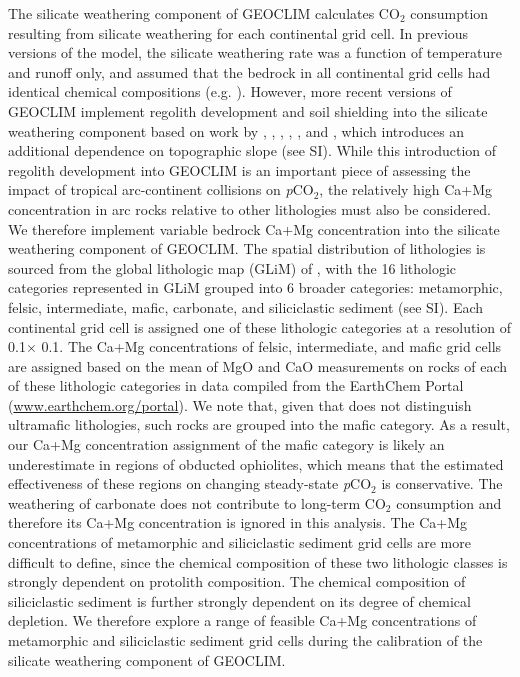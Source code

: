 \documentclass[11pt,letterpaper]{article}
\newcommand{\degrees}{\textdegree\xspace}
\newcommand{\pCOtwo}{\textit{p}CO$_{2}$\xspace}
\newcommand{\COtwo}{CO$_{2}$\xspace}
\begin{document}
The silicate weathering component of GEOCLIM calculates \COtwo consumption resulting from silicate weathering for each continental grid cell. In previous versions of the model, the silicate weathering rate was a function of temperature and runoff only, and assumed that the bedrock in all continental grid cells had identical chemical compositions (e.g. \citealp{Godderis2014a}). However, more recent versions of GEOCLIM implement regolith development and soil shielding into the silicate weathering component based on work by \citet{Heimsath1997a}, \citet{Gabet2009a}, \citet{West2012a}, \citet{Carretier2014a}, \citet{Godderis2017b}, and \citet{Maffre2018a}, which introduces an additional dependence on topographic slope (see SI). While this introduction of regolith development into GEOCLIM is an important piece of assessing the impact of tropical arc-continent collisions on \pCOtwo, the relatively high Ca+Mg concentration in arc rocks relative to other lithologies must also be considered. We therefore implement variable bedrock Ca+Mg concentration into the silicate weathering component of GEOCLIM. The spatial distribution of lithologies is sourced from the global lithologic map (GLiM) of \citet{Hartmann2012a}, with the 16 lithologic categories represented in GLiM grouped into 6 broader categories: metamorphic, felsic, intermediate, mafic, carbonate, and siliciclastic sediment (see SI). Each continental grid cell is assigned one of these lithologic categories at a resolution of 0.1\degrees $\times$ 0.1\degrees. The Ca+Mg concentrations of felsic, intermediate, and mafic grid cells are assigned based on the mean of MgO and CaO measurements on rocks of each of these lithologic categories in data compiled from the EarthChem Portal (\url{www.earthchem.org/portal}). We note that, given that \citet{Hartmann2012a} does not distinguish ultramafic lithologies, such rocks are grouped into the mafic category. As a result, our Ca+Mg concentration assignment of the mafic category is likely an underestimate in regions of obducted ophiolites, which means that the estimated effectiveness of these regions on changing steady-state \pCOtwo is conservative. The weathering of carbonate does not contribute to long-term \COtwo consumption and therefore its Ca+Mg concentration is ignored in this analysis. The Ca+Mg concentrations of metamorphic and siliciclastic sediment grid cells are more difficult to define, since the chemical composition of these two lithologic classes is strongly dependent on protolith composition. The chemical composition of siliciclastic sediment is further strongly dependent on its degree of chemical depletion. We therefore explore a range of feasible Ca+Mg concentrations of metamorphic and siliciclastic sediment grid cells during the calibration of the silicate weathering component of GEOCLIM.
\end{document}
